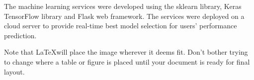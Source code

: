 The machine learning services were developed using the 
sklearn library, Keras TensorFlow library and Flask web framework. The services were deployed on a cloud server to provide real-time best
model selection for users' performance prediction.

Note that \LaTeX will place the image wherever it deems fit. Don't bother trying to change where a table or figure is placed until your document is ready for final layout.